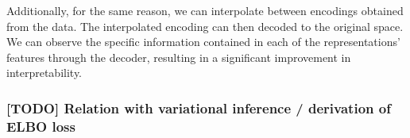 	Additionally, for the same reason, we can interpolate between encodings obtained from the data. The interpolated encoding can then decoded to the original space. We can observe the specific information contained in each of the representations' features through the decoder, resulting in a significant improvement in interpretability.



\subsubsection{[TODO] Relation with variational inference / derivation of ELBO loss}
	
	
